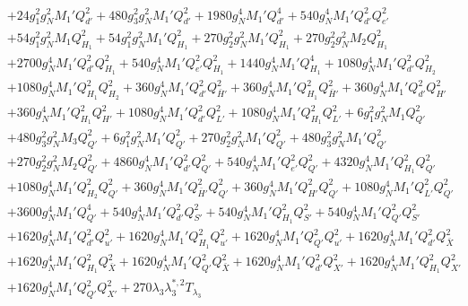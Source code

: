 {\begin{align}
 &+24 g_{1}^{2} g_{N}^{2} M_1' Q_{d'}^{2} +480 g_{3}^{2} g_{N}^{2} M_1' Q_{d'}^{2} +1980 g_{N}^{4} M_1' Q_{d'}^{4} +540 g_{N}^{4} M_1' Q_{d'}^{2} Q_{e'}^{2} \nonumber \\ 
 &+54 g_{1}^{2} g_{N}^{2} M_1 Q_{H_1}^{2} +54 g_{1}^{2} g_{N}^{2} M_1' Q_{H_1}^{2} +270 g_{2}^{2} g_{N}^{2} M_1' Q_{H_1}^{2} +270 g_{2}^{2} g_{N}^{2} M_2 Q_{H_1}^{2} \nonumber \\ 
 &+2700 g_{N}^{4} M_1' Q_{d'}^{2} Q_{H_1}^{2} +540 g_{N}^{4} M_1' Q_{e'}^{2} Q_{H_1}^{2} +1440 g_{N}^{4} M_1' Q_{H_1}^{4} +1080 g_{N}^{4} M_1' Q_{d'}^{2} Q_{H_2}^{2} \nonumber \\ 
 &+1080 g_{N}^{4} M_1' Q_{H_1}^{2} Q_{H_2}^{2} +360 g_{N}^{4} M_1' Q_{d'}^{2} Q_{\bar{H}'}^{2} +360 g_{N}^{4} M_1' Q_{H_1}^{2} Q_{\bar{H}'}^{2} +360 g_{N}^{4} M_1' Q_{d'}^{2} Q_{H'}^{2} \nonumber \\ 
 &+360 g_{N}^{4} M_1' Q_{H_1}^{2} Q_{H'}^{2} +1080 g_{N}^{4} M_1' Q_{d'}^{2} Q_{L'}^{2} +1080 g_{N}^{4} M_1' Q_{H_1}^{2} Q_{L'}^{2} +6 g_{1}^{2} g_{N}^{2} M_1 Q_{Q'}^{2} \nonumber \\ 
 &+480 g_{3}^{2} g_{N}^{2} M_3 Q_{Q'}^{2} +6 g_{1}^{2} g_{N}^{2} M_1' Q_{Q'}^{2} +270 g_{2}^{2} g_{N}^{2} M_1' Q_{Q'}^{2} +480 g_{3}^{2} g_{N}^{2} M_1' Q_{Q'}^{2} \nonumber \\ 
 &+270 g_{2}^{2} g_{N}^{2} M_2 Q_{Q'}^{2} +4860 g_{N}^{4} M_1' Q_{d'}^{2} Q_{Q'}^{2} +540 g_{N}^{4} M_1' Q_{e'}^{2} Q_{Q'}^{2} +4320 g_{N}^{4} M_1' Q_{H_1}^{2} Q_{Q'}^{2} \nonumber \\ 
 &+1080 g_{N}^{4} M_1' Q_{H_2}^{2} Q_{Q'}^{2} +360 g_{N}^{4} M_1' Q_{\bar{H}'}^{2} Q_{Q'}^{2} +360 g_{N}^{4} M_1' Q_{H'}^{2} Q_{Q'}^{2} +1080 g_{N}^{4} M_1' Q_{L'}^{2} Q_{Q'}^{2} \nonumber \\ 
 &+3600 g_{N}^{4} M_1' Q_{Q'}^{4} +540 g_{N}^{4} M_1' Q_{d'}^{2} Q_{S'}^{2} +540 g_{N}^{4} M_1' Q_{H_1}^{2} Q_{S'}^{2} +540 g_{N}^{4} M_1' Q_{Q'}^{2} Q_{S'}^{2} \nonumber \\ 
 &+1620 g_{N}^{4} M_1' Q_{d'}^{2} Q_{u'}^{2} +1620 g_{N}^{4} M_1' Q_{H_1}^{2} Q_{u'}^{2} +1620 g_{N}^{4} M_1' Q_{Q'}^{2} Q_{u'}^{2} +1620 g_{N}^{4} M_1' Q_{d'}^{2} Q_{\bar{X}}^{2} \nonumber \\ 
 &+1620 g_{N}^{4} M_1' Q_{H_1}^{2} Q_{\bar{X}}^{2} +1620 g_{N}^{4} M_1' Q_{Q'}^{2} Q_{\bar{X}}^{2} +1620 g_{N}^{4} M_1' Q_{d'}^{2} Q_{X'}^{2} +1620 g_{N}^{4} M_1' Q_{H_1}^{2} Q_{X'}^{2} \nonumber \\ 
 &+1620 g_{N}^{4} M_1' Q_{Q'}^{2} Q_{X'}^{2} +270 \lambda_3 \lambda_{3}^{*,2} T_{\lambda_3} \nonumber \\ 

\end{align}}
